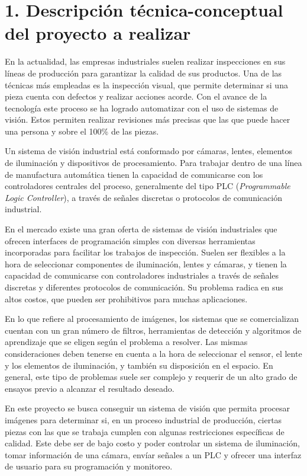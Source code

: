 \documentclass[
11pt, %
codirector, %
]{charter}
\begin{document}
\section{1. Descripción técnica-conceptual del proyecto a realizar}
\label{sec:descripcion}

En la actualidad, las empresas industriales suelen realizar inspecciones en sus líneas de producción para garantizar la calidad de sus productos. Una de las técnicas más empleadas es la inspección visual, que permite determinar si una pieza cuenta con defectos y realizar acciones acorde. Con el avance de la tecnología este proceso se ha logrado automatizar con el uso de sistemas de visión. Estos permiten realizar revisiones más precisas que las que puede hacer una persona y sobre el 100\% de las piezas.

Un sistema de visión industrial está conformado por cámaras, lentes, elementos de iluminación y dispositivos de procesamiento. Para trabajar dentro de una línea de manufactura automática tienen la capacidad de comunicarse con los controladores centrales del proceso, generalmente del tipo PLC (\textit{Programmable Logic Controller}), a través de señales discretas o protocolos de comunicación industrial. 

En el mercado existe una gran oferta de sistemas de visión industriales que ofrecen interfaces de programación simples con diversas herramientas incorporadas para facilitar los trabajos de inspección. Suelen ser flexibles a la hora de seleccionar componentes de iluminación, lentes y cámaras, y tienen la capacidad de comunicarse con controladores industriales a través de señales discretas y diferentes protocolos de comunicación. Su problema radica en sus altos costos, que pueden ser prohibitivos para muchas aplicaciones.

En lo que refiere al procesamiento de imágenes, los sistemas que se comercializan cuentan con un gran número de filtros, herramientas de detección y algoritmos de aprendizaje que se eligen según el problema a resolver. Las mismas consideraciones deben tenerse en cuenta a la hora de seleccionar el sensor, el lente y los elementos de iluminación, y también su disposición en el espacio. En general, este tipo de problemas suele ser complejo y requerir de un alto grado de ensayos previo a alcanzar el resultado deseado.

En este proyecto se busca conseguir un sistema de visión que permita procesar imágenes para determinar si, en un proceso industrial de producción, ciertas piezas con las que se trabaja cumplen con algunas restricciones específicas de calidad. Este debe ser de bajo costo y poder controlar un sistema de iluminación, tomar información de una cámara, envíar señales a un PLC y ofrecer una interfaz de usuario para su programación y monitoreo. 
\end{document}
